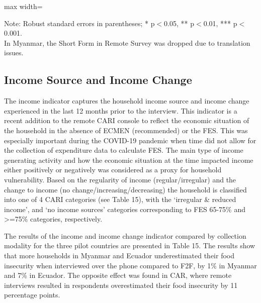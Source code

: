 \documentclass[11pt,harvard]{article}
\begin{document}
	\begin{table}[htbp]
		\centering
		\begin{adjustbox}{max width=\textwidth}
			\begin{threeparttable}
				\caption{Impact of Survey Modality on Expenditure and Food Expenditure Share}
				\scriptsize
				 
				\label{tab:FES_Modality_All_Country}
				\begin{tablenotes}
					\item Note: Robust standard errors in parentheses; * p$<$0.05, ** p$<$0.01, *** p$<$0.001. \\ 
					In Myanmar, the Short Form in Remote Survey was dropped due to translation issues.
				\end{tablenotes}
			\end{threeparttable}
		\end{adjustbox}
	\end{table}
	
	\pagebreak
	
\subsection{Income Source and Income Change}
	
The income indicator captures the household income source and income change experienced in the last 12 months prior to the interview. This indicator is a recent addition to the remote CARI console to reflect the economic situation of the household in the absence of ECMEN (recommended) or the FES. This was especially important during the COVID-19 pandemic when time did not allow for the collection of expenditure data to calculate FES. The main type of income generating activity  and how the economic situation at the time impacted  income either positively or negatively was considered as a proxy for household vulnerability. Based on the regularity of income (regular/irregular) and the change to income (no change/increasing/decreasing)  the household is classified into one of 4 CARI categories (see Table 15), with the ‘irregular \& reduced income’, and ‘no income sources’ categories corresponding to FES 65-75\% and >=75\% categories, respectively.

The results of the income and income change indicator compared by collection modality for the three pilot countries are presented in Table 15. The results show that more households in Myanmar and Ecuador underestimated their food insecurity when interviewed over the phone compared to F2F, by 1\% in Myanmar and 7\% in Ecuador. The opposite effect was found in CAR, where remote interviews resulted in respondents overestimated their food insecurity by 11 percentage points.    
	
\end{document}
